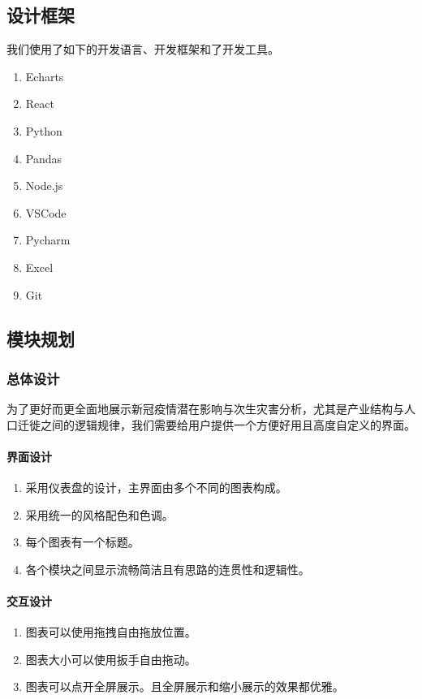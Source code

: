 \documentclass{ctexart}
\begin{document}
\subsection{设计框架}
我们使用了如下的开发语言、开发框架和了开发工具。
\begin{enumerate}
    \item Echarts
    \item React
    \item Python
    \item Pandas
    \item Node.js
    \item VSCode
    \item Pycharm
    \item Excel
    \item Git
\end{enumerate}
\subsection{模块规划}
\subsubsection{总体设计}
为了更好而更全面地展示新冠疫情潜在影响与次生灾害分析，尤其是产业结构与人口迁徙之间的逻辑规律，我们需要给用户提供一个方便好用且高度自定义的界面。
\paragraph{界面设计}
\begin{enumerate}
    \item 采用仪表盘的设计，主界面由多个不同的图表构成。
    \item 采用统一的风格配色和色调。
    \item 每个图表有一个标题。
    \item 各个模块之间显示流畅简洁且有思路的连贯性和逻辑性。
\end{enumerate}

\paragraph{交互设计}
\begin{enumerate}
    \item 图表可以使用拖拽自由拖放位置。
    \item 图表大小可以使用扳手自由拖动。
    \item 图表可以点开全屏展示。且全屏展示和缩小展示的效果都优雅。
\end{enumerate}
\end{document}
